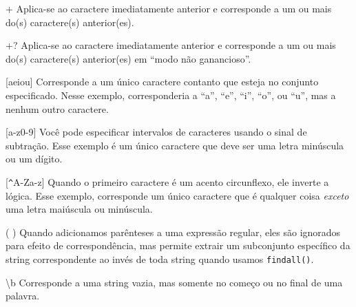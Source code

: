 + \newline
Aplica-se ao caractere imediatamente anterior e corresponde a um ou mais
do(s) caractere(s) anterior(es).

+? \newline
Aplica-se ao caractere imediatamente anterior e corresponde a um ou mais
do(s) caractere(s) anterior(es) em ``modo não ganancioso''.

[aeiou] \newline
Corresponde a um único caractere contanto que esteja no conjunto especificado.
Nesse exemplo, corresponderia a  ``a'', ``e'', ``i'', ``o'', ou ``u'', mas a
nenhum outro caractere.

[a-z0-9] \newline
Você pode especificar intervalos de caracteres usando o sinal de subtração.
Esse exemplo é um único caractere que deve ser uma letra minúscula ou um dígito.

[\verb"^"A-Za-z] \newline
Quando o primeiro caractere é um acento circunflexo, ele inverte a lógica. 
Esse exemplo, corresponde um único caractere que é qualquer coisa {\em exceto}
uma letra maiúscula ou minúscula.

( ) \newline
Quando adicionamos parênteses a uma expressão regular, eles são ignorados
para efeito de correspondência, mas permite extrair um subconjunto específico
da string correspondente ao invés de toda string quando usamos {\tt findall()}.

{\textbackslash}b \newline
Corresponde a uma string vazia, mas somente no começo ou no final de uma palavra.


